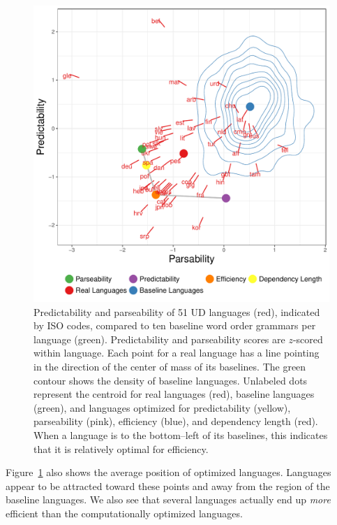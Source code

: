 \documentclass[9pt,twocolumn,twoside,lineno]{pnas-new}
\begin{document}
\begin{figure}
    \centering
    \includegraphics[scale=.45]{../results/plane/pareto-plane-iso-best-balanced-legend.pdf}
    \caption{Predictability and parseability of 51 UD languages (red), indicated by ISO codes, compared to ten baseline word order grammars per language (green). Predictability and parseability scores are $z$-scored within language. Each point for a real language has a line pointing in the direction of the center of mass of its baselines. The green contour shows the density of baseline languages. Unlabeled dots represent the centroid for real languages (red), baseline languages (green), and languages optimized for predictability (yellow), parseability (pink), efficiency (blue), and dependency length (red). When a language is to the bottom--left of its baselines, this indicates that it is relatively optimal for efficiency.} %
    \label{fig:pareto-plane}
\end{figure}

Figure~\ref{fig:pareto-plane} also shows the average position of optimized languages. Languages appear to be attracted toward these points and away from the region of the baseline languages. We also see that several languages actually end up \emph{more} efficient than the computationally optimized languages.
\end{document}

